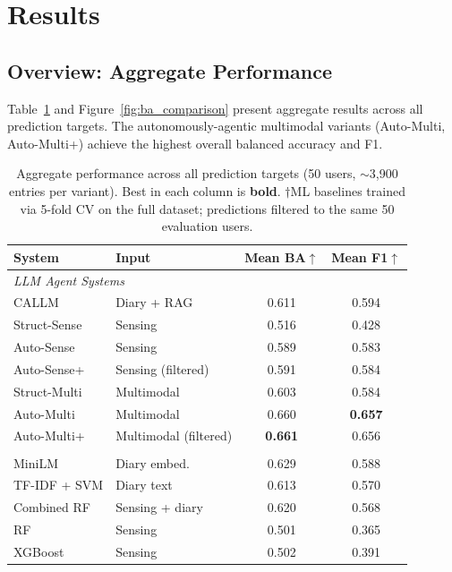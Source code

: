\documentclass[screen,review,anonymous]{acmart}
\begin{document}
\section{Results}

\subsection{Overview: Aggregate Performance}

Table~\ref{tab:main_results} and Figure~\ref{fig:ba_comparison} present aggregate results across all prediction targets. The autonomously-agentic multimodal variants (Auto-Multi, Auto-Multi+) achieve the highest overall balanced accuracy and F1.

\begin{table}[t]
\caption{Aggregate performance across all prediction targets (50 users, ${\sim}$3,900 entries per variant). Best in each column is \textbf{bold}. $\dagger$ML baselines trained via 5-fold CV on the full dataset; predictions filtered to the same 50 evaluation users.}
\label{tab:main_results}
\small
\begin{tabular}{llcc}
\toprule
\textbf{System} & \textbf{Input} & \textbf{Mean BA}$\uparrow$ & \textbf{Mean F1}$\uparrow$ \\
\midrule
\multicolumn{4}{l}{\emph{LLM Agent Systems}} \\
CALLM & Diary + RAG & 0.611 & 0.594 \\
Struct-Sense & Sensing & 0.516 & 0.428 \\
Auto-Sense & Sensing & 0.589 & 0.583 \\
Auto-Sense+ & Sensing (filtered) & 0.591 & 0.584 \\
Struct-Multi & Multimodal & 0.603 & 0.584 \\
Auto-Multi & Multimodal & 0.660 & \textbf{0.657} \\
Auto-Multi+ & Multimodal (filtered) & \textbf{0.661} & 0.656 \\
\addlinespace
\multicolumn{4}{l}{\emph{Baselines}$^\dagger$} \\
MiniLM & Diary embed. & 0.629 & 0.588 \\
TF-IDF + SVM & Diary text & 0.613 & 0.570 \\
Combined RF & Sensing + diary & 0.620 & 0.568 \\
RF & Sensing & 0.501 & 0.365 \\
XGBoost & Sensing & 0.502 & 0.391 \\
\bottomrule
\end{tabular}
\end{table}
\end{document}
